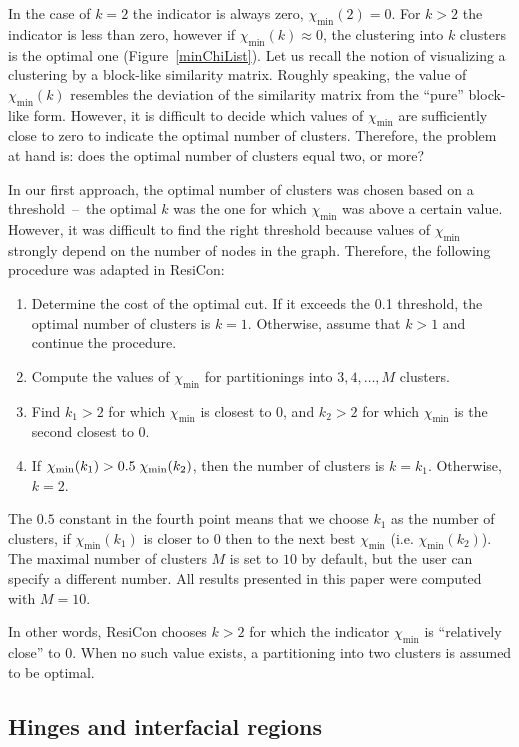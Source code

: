 \documentclass[a4paper,11pt,twoside]{book}%
\begin{document}
In the case of $k=2$ the indicator is always zero, $\chi_\text{min}(2)=0$.
For $k>2$ the indicator is less than zero, however if $\chi_\text{min}(k)\approx 0$, the clustering into $k$ clusters is the optimal one (Figure~\ref{minChiList}).
Let us recall the notion of visualizing a clustering by a block-like similarity matrix.
Roughly speaking, the value of $\chi_\text{min}(k)$ resembles the deviation of the similarity matrix from the ``pure'' block-like form.
However, it is difficult to decide which values of $\chi_\text{min}$ are sufficiently close to zero to indicate the optimal number of clusters.
Therefore, the problem at hand is: does the optimal number of clusters equal two, or more?

In our first approach, the optimal number of clusters was chosen based on a threshold~--~the optimal $k$ was the one for which $\chi_{\text{min}}$ was above a certain value.
However, it was difficult to find the right threshold because values of $\chi_{\text{min}}$ strongly depend on the number of nodes in the graph.
Therefore, the following procedure was adapted in ResiCon:
\begin{enumerate}
\item Determine the cost of the optimal cut.
If it exceeds the 0.1 threshold, the optimal number of clusters is $k=1$.
Otherwise, assume that $k>1$ and continue the procedure.
\item Compute the values of $\chi_{\text{min}}$ for partitionings into $ 3,4,\ldots,M$ clusters.
\item Find $k_1>2$ for which $\chi_{\text{min}}$ is closest to 0, and $k_2>2$ for which $\chi_{\text{min}}$ is the second closest to 0.
\item If $\chi_{\text{min}}(k_1)>0.5\hspace{1mm}\chi_\text{min}(k_2)$, then the number of clusters is $k=k_1$.
Otherwise, $k=2$.
\end{enumerate}
The $0.5$ constant in the fourth point means that we choose $k_1$ as the number of clusters, if $\chi_\text{min}(k_1)$ is closer to $0$ then to the next best $\chi_\text{min}$ (i.e. $\chi_\text{min}(k_2)$).
The maximal number of clusters $M$ is set to $10$ by default, but the user can specify a different number.
All results presented in this paper were computed with $M=10$.

In other words, ResiCon chooses $k>2$ for which the indicator $\chi_\text{min}$ is ``relatively close'' to 0.
When no such value exists, a partitioning into two clusters is assumed to be optimal.
\subsection*{Hinges and interfacial regions}
\end{document}
